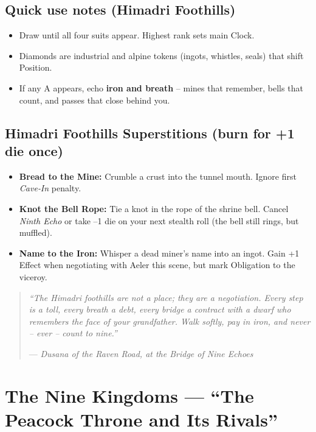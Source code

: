 \documentclass[11pt]{book}
\newenvironment{lorebox}{\begin{quote}\small\itshape}{\end{quote}}
\begin{document}
\subsection*{Quick use notes (Himadri Foothills)}
\begin{itemize}
\item Draw until all four suits appear. Highest rank sets main Clock.
\item Diamonds are industrial and alpine tokens (ingots, whistles, seals) that shift Position.
\item If any A appears, echo \textbf{iron and breath} – mines that remember, bells that count, and passes that close behind you.
\end{itemize}

\subsection*{Himadri Foothills Superstitions (burn for +1 die once)}
\begin{itemize}
\item \textbf{Bread to the Mine:} Crumble a crust into the tunnel mouth. Ignore first \textit{Cave‑In} penalty.
\item \textbf{Knot the Bell Rope:} Tie a knot in the rope of the shrine bell. Cancel \textit{Ninth Echo} or take –1 die on your next stealth roll (the bell still rings, but muffled).
\item \textbf{Name to the Iron:} Whisper a dead miner’s name into an ingot. Gain +1 Effect when negotiating with Aeler this scene, but mark Obligation to the viceroy.
\end{itemize}

\begin{lorebox}
“The Himadri foothills are not a place; they are a negotiation. Every step is a toll, every breath a debt, every bridge a contract with a dwarf who remembers the face of your grandfather. Walk softly, pay in iron, and never – ever – count to nine.”

--- \textit{Dusana of the Raven Road, at the Bridge of Nine Echoes}
\end{lorebox}

\section{The Nine Kingdoms — ``The Peacock Throne and Its Rivals''}
\label{sec:nine-kingdoms}
\end{document}
